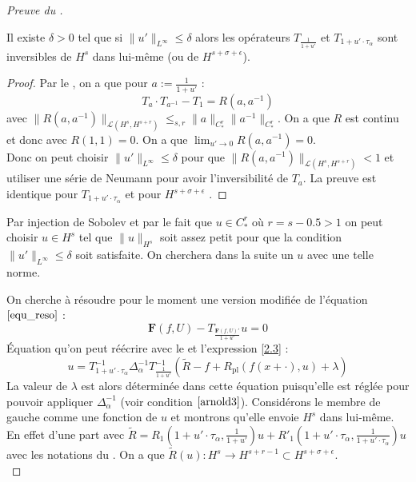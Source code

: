 \documentclass[11pt,a4paper]{article}
\begin{document}
\begin{proof}[Preuve du ]
\begin{lemma}\label{inversibilite} 
Il existe $\delta>0$ tel que si $\|u'\|_{L^\infty} \leq \delta $ alors les opérateurs $T_{\frac{1}{1+u'}}$ et $T_{1+u'\cdot \tau_\alpha}$ sont inversibles de $H^s$ dans lui-même (ou de $ H^{s+\sigma+\epsilon}$).
\end{lemma}
\begin{proof}
Par le , on a que pour $a:=\frac{1}{1+u'}$ :
\begin{equation*}
T_a\cdot T_{a^{-1}} -T_1=R(a,a^{-1})
\end{equation*}
avec $\|R(a,a^{-1})\|_{\mathcal{L}(H^s,H^{s+r})} \leq_{s,r} \|a\|_{C^r_*} \|a^{-1}\|_{C^r_*}$. On a que $R$ est continu et donc avec $ R(1,1)=0$. On a que $\lim_{u' \to 0} R(a,a^{-1})=0$. \\
Donc on peut choisir  $\|u'\|_{L^\infty} \leq \delta $  pour que $\|R(a,a^{-1})\|_{\mathcal{L}(H^s,H^{s+r})}<1 $ et utiliser une série de Neumann pour avoir l'inversibilité de $T_a$. La preuve est identique pour $T_{1+u'\cdot \tau_\alpha }$ et pour $ H^{s+\sigma +\epsilon}$ . 
\end{proof}
\begin{rmq}
Par injection de Sobolev et par le fait que $u \in C^r_*$ où $r=s-0.5>1$ on peut choisir  $u \in H^s$ tel que $\|u\|_{H^s}$ soit assez petit pour que la condition $\|u'\|_{L^\infty} \leq \delta $ soit satisfaite. On cherchera dans la suite un $u$ avec une telle norme.
\end{rmq}
On cherche à résoudre pour le moment une version modifiée de l'équation $\eqref{equ_reso}$ :
\begin{equation}\label{equ_reso2}
\mathbf{F}(f,U)-T_{\frac{\mathbf{F}(f,U)'}{1+u'}}u=0
\end{equation}
Équation qu'on peut réécrire avec le  et l'expression \eqref{2.3} :
\begin{equation}\label{equ_reso3}
u=T_{1+u' \cdot \tau_\alpha}^{-1} \Delta_\alpha^{-1} T_{\frac{1}{1+u'}}^{-1}(\tilde{R} -f +R_{\text{pl}}(f(x+\cdot),u) + \lambda)
\end{equation}
La valeur de $\lambda$ est alors déterminée dans cette équation puisqu'elle est réglée pour pouvoir appliquer $\Delta_\alpha^{-1}$ (voir condition $\eqref{arnold3}$).
Considérons le membre de gauche comme une fonction de $u$ et montrons qu'elle envoie $H^s$ dans lui-même.
En effet d'une part avec $\tilde{R}=R_1(1+u'\cdot \tau_\alpha,\frac{1}{1+u'})u +R'_1 ( 1+u' \cdot \tau_\alpha ,\frac{1}{1+u' \cdot \tau_\alpha})u$ avec les notations du . On a que $\tilde{R}(u) : H^s \to H^{s+r-1} \subset H^{s+\sigma +\epsilon}$. \\

\end{proof}
\end{document}
